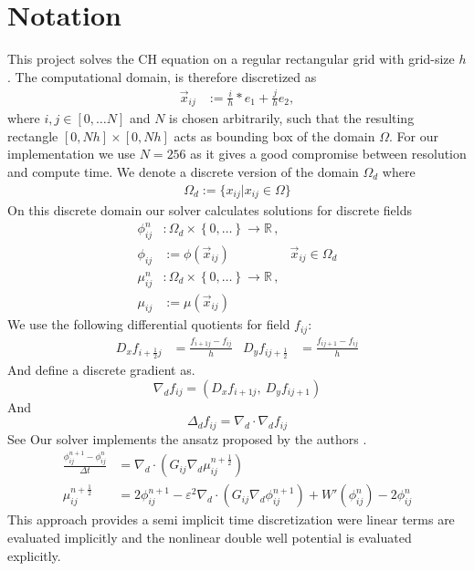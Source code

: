 \documentclass{mimosis}
\begin{document}
\section{Notation}
\label{sec:org1dc8c17}
This project solves the CH equation on a regular rectangular grid with grid-size \(h\). The computational domain, is therefore discretized as
\begin{align}
\label{eq:4}
\vec{x}_{ij} &:= \frac{i}{h} * e_{1} + \frac{j}{h} e_2,
\end{align}
where \(i,j \in [0 , \dots N]\) and \(N\) is chosen arbitrarily, such that the resulting rectangle \([0 , Nh] \times [0,Nh]\) acts as bounding box of the domain \(\Omega\). For our implementation we use \(N=256\) as it gives a good compromise between resolution and compute time. We denote a discrete version of the domain \(\Omega_d\) where
\begin{align}
\label{eq:8}
\Omega_d := \{x_{ij} | x_{ij} \in \Omega\}
\end{align}
On this discrete domain our solver calculates solutions for discrete fields
\begin{align}
\label{eq:5}
\phi_{ij}^n &: \Omega_d \times \left\{ 0, \dots  \right\} \to \mathbb{R} \,,\\
\phi_{ij} &:= \phi(\vec{x}_{ij}) & \vec{x}_{ij} \in \Omega_{d} \\
\mu_{ij}^n &: \Omega_d \times \left\{ 0, \dots \right\} \to \mathbb{R} \,, \\
\mu_{ij} &:= \mu(\vec{x}_{ij})
\end{align}
We use the following differential quotients for field \(f_{ij}\):
\begin{align}
D_xf_{i+\frac{1}{2} j} &= \frac{f_{i+1j} - f_{ij}}{h} & D_yf_{ij+\frac{1}{2}} &= \frac{f_{ij+1} - f_{ij}}{h}
\end{align}
And define a discrete gradient as.
\begin{equation}
\nabla_d f_{ij} = (D_x f_{i+1j} , \ D_y f_{ij+1})
\end{equation}
And
\begin{equation}
\Delta_d f_{ij} =  \nabla_{d} \cdot \nabla_d f_{ij}
\end{equation}
See \autocite{Ulmer_CHRelaxed_2024}
Our solver implements the ansatz proposed by the authors \autocite{SHIN20117441}.
\begin{equation}
\label{eq:ansatz}
\begin{aligned}
\frac{\phi_{ij}^{n+1} - \phi_{ij}^n}{\Delta t}  &=  \nabla _d \cdot (G_{ij} \nabla_d \mu_{ij}^{n+\frac{1}{2}} )  \\
 \mu_{ij}^{n+\frac{1}{2}} &= 2\phi_{ij}^{n+1} - \varepsilon^2  \nabla_d \cdot  (G_{ij} \nabla _d \phi_{ij}^{n+1} ) + W'(\phi_{ij}^n) - 2\phi _{ij}^n
\end{aligned}
\end{equation}
This approach provides a semi implicit time discretization were linear terms are evaluated implicitly and the nonlinear double well potential is evaluated explicitly.
\end{document}
